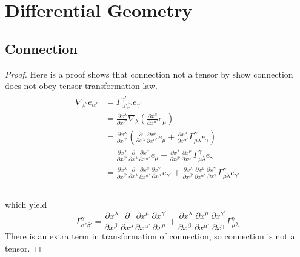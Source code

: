 \documentclass[12pt]{article}
\theoremstyle{mystyle}{\newtheorem{definition}{Definition}[section]}
\theoremstyle{mystyle}{\newtheorem{theorem}[definition]{Theorem}}
\theoremstyle{mystyle}{\newtheorem*{remark}{Remark}}
\theoremstyle{mystyle}{\newtheorem*{example}{Example}}
\theoremstyle{mystyle}{\newtheorem*{examples}{Examples}}
\theoremstyle{cstyle}{\newtheorem*{cthm}{}}
\begin{document}
\section{Differential Geometry}

\subsection{Connection}
\begin{proof}
    Here is a proof shows that connection not a tensor by show connection does not obey tensor transformation law.
    \begin{align*}
        \begin{split}
    \nabla_{\beta'}e_{\alpha'} & = \Gamma^{\gamma'}_{\alpha'\beta'}e_{\gamma'} \\
    &= \frac{\partial x^{\lambda}}{\partial x^{\beta'}}\nabla_{\lambda}(\frac{\partial x^{\mu}}{\partial x^{\alpha'}}e_{\mu})\\
    &= \frac{\partial x^{\lambda}}{\partial x^{\beta'}}(\frac{\partial}{\partial x^{\lambda}}\frac{\partial x^{\mu}}{\partial x^{\alpha'}}e_{\mu}
    + \frac{\partial x^{\mu}}{\partial x^{\alpha'}} \Gamma ^{\gamma}_{\mu\lambda} e_{\gamma})\\
    &= \frac{\partial x^{\lambda}}{\partial x^{\beta'}}\frac{\partial}{\partial x^{\lambda}}\frac{\partial x^{\mu}}{\partial x^{\alpha'}}e_{\mu}
    + \frac{\partial x^{\lambda}}{\partial x^{\beta'}}\frac{\partial x^{\mu}}{\partial x^{\alpha'}} \Gamma ^{\gamma}_{\mu\lambda} e_{\gamma}\\
    &= \frac{\partial x^{\lambda}}{\partial x^{\beta'}}\frac{\partial}{\partial x^{\lambda}}\frac{\partial x^{\mu}}{\partial x^{\alpha'}}\frac{\partial x^{\gamma'}}{\partial x^{\mu}}e_{\gamma'}
    + \frac{\partial x^{\lambda}}{\partial x^{\beta'}}\frac{\partial x^{\mu}}{\partial x^{\alpha'}} \frac{\partial x^{\gamma'}}{\partial x^{\gamma}} \Gamma ^{\gamma}_{\mu\lambda}  e_{\gamma'}\\
        \end{split}
    \end{align*}
    \\
    which yield \[\Gamma^{\gamma'}_{\alpha'\beta'} = \frac{\partial x^{\lambda}}{\partial x^{\beta'}}\frac{\partial}{\partial x^{\lambda}}\frac{\partial x^{\mu}}{\partial x^{\alpha'}}\frac{\partial x^{\gamma'}}{\partial x^{\mu}}
    + \frac{\partial x^{\lambda}}{\partial x^{\beta'}}\frac{\partial x^{\mu}}{\partial x^{\alpha'}} \frac{\partial x^{\gamma'}}{\partial x^{\gamma}} \Gamma ^{\gamma}_{\mu\lambda}\]
    There is an extra term in transformation of connection, so connection is not a tensor.
\end{proof}
\end{document}
